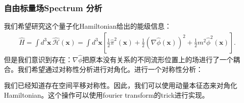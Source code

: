 \subsubsection{自由标量场Spectrum 分析}

\bigskip
{}

我们希望研究这个量子化Hamiltonian给出的能级信息：
\begin{align}
  \hat{H} = \int d^3\mathbf{x}\,
  \hat{\mathcal{H}}(\mathbf{x})
  = \int d^3\mathbf{x} \left[
    \frac{1}{2} \hat{\pi}^2(\mathbf{x})
    + \frac{1}{2} \left(\nabla \hat{\phi}(\mathbf{x})\right)^2
    + \frac{1}{2} m^2 \hat{\phi}^2(\mathbf{x})
  \right].
\end{align}
但是我们意识到存在：$ \nabla \hat{\phi}
$把原本没有关系的不同流形位置上的场进行了一个耦合。我们希望通过对称性分析进行对角化。进行一个对称性分析：

我们已经知道存在空间平移对称性。因此，我们可以使用动量本征态来对角化Hamiltonian。这个操作可以使用fourier
transform的trick进行实现。

\bigskip
{}

